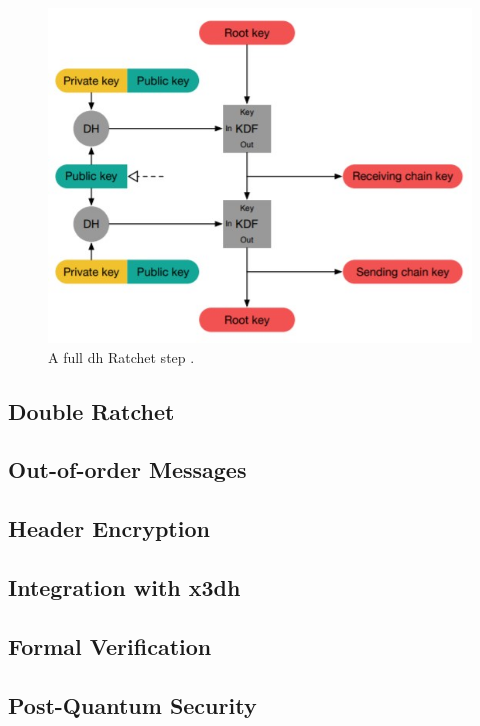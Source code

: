 \begin{figure}[hptb]
	\centering
	\includegraphics[scale=0.6]{Images/fullDHRatchetStep.jpg}
	\caption{A full \gls{dh} Ratchet step \cite{dblRtcht}.}
	\label{fig:dh-ratchet_chain}
\end{figure}

\subsection{Double Ratchet}

\subsection{Out-of-order Messages}

\subsection{Header Encryption}

\subsection{Integration with \gls*{x3dh}}

\subsection{Formal Verification}

\subsection{Post-Quantum Security}
